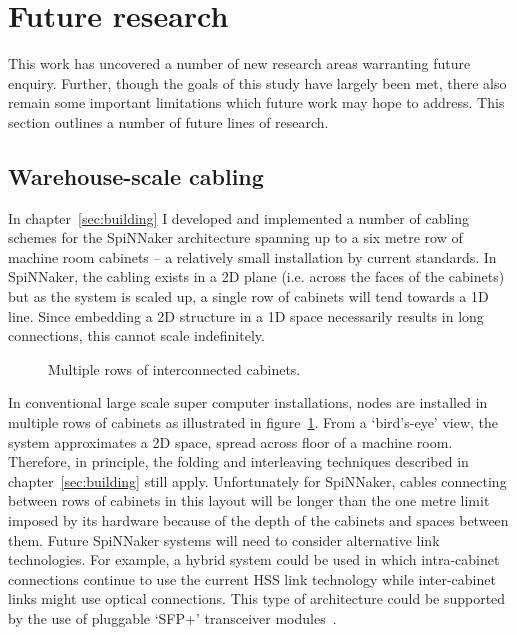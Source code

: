 	\section{Future research}
		
		This work has uncovered a number of new research areas warranting future
		enquiry. Further, though the goals of this study have largely been met,
		there also remain some important limitations which future work may hope to
		address.  This section outlines a number of future lines of research.
		
		\subsection{Warehouse-scale cabling}
			
			In chapter~\ref{sec:building} I developed and implemented a number of
			cabling schemes for the SpiNNaker architecture spanning up to a six metre
			row of machine room cabinets -- a relatively small installation by
			current standards. In SpiNNaker, the cabling exists in a 2D plane (i.e.
			across the faces of the cabinets) but as the system is scaled up, a
			single row of cabinets will tend towards a 1D line. Since embedding a 2D
			structure in a 1D space necessarily results in long connections, this
			cannot scale indefinitely.
			
			\begin{figure}
				\center
				
				\caption{Multiple rows of interconnected cabinets.}
				\label{fig:multi-row-cabling}
			\end{figure}
			
			In conventional large scale super computer installations, nodes are
			installed in multiple rows of cabinets as illustrated in
			figure~\ref{fig:multi-row-cabling}.  From a `bird's-eye' view, the system
			approximates a 2D space, spread across floor of a machine room.
			Therefore, in principle, the folding and interleaving techniques
			described in chapter~\ref{sec:building} still apply. Unfortunately for
			SpiNNaker, cables connecting between rows of cabinets in this layout will
			be longer than the one metre limit imposed by its hardware because of the
			depth of the cabinets and spaces between them.  Future SpiNNaker systems
			will need to consider alternative link technologies.  For example, a
			hybrid system could be used in which intra-cabinet connections continue
			to use the current HSS link technology while inter-cabinet links might
			use optical connections. This type of architecture could be supported by
			the use of pluggable `SFP+' transceiver modules~\cite{sff01}.
		
